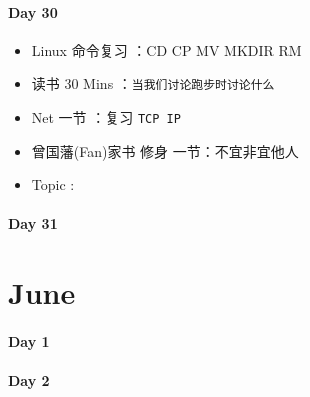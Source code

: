 \documentclass[UTF8,a4paper,8pt]{ctexart}
\begin{document}
 	 \paragraph{Day 30      \quad     }
	 	 \begin{itemize}[itemindent = 1em]
	 	 	\renewcommand\labelitemi{\makebox[0pt][l]{$\square$}\hspace{1em}} 
	 	 	\renewcommand\labelitemi{\makebox[0pt][l]{$\square$}\raisebox{.15ex}{\hspace{0.1em}$\checkmark$}}	 	
	 	 	\item   Linux 命令复习 ：CD  CP  MV MKDIR RM
	 	 	
	 	 	\item   读书  30 Mins	：\verb|当我们讨论跑步时讨论什么|
	 	 	\item   Net 一节 ：复习 \verb|TCP IP|	
	 	 	\renewcommand\labelitemi{\makebox[0pt][l]{$\square$}\hspace{1em}} 
	 	 	
	 	 	
	 	 	\renewcommand\labelitemi{\makebox[0pt][l]{$\square$}\raisebox{.15ex}{\hspace{0.1em}$\checkmark$}}
	 	 	\item   曾国藩(Fan)家书 修身 一节：不宜非宜他人
	 	 	\item   Topic :
	 	 \end{itemize}
	 	 
 	 \paragraph{Day 31      \quad     }
 	 
 \section{June}
 	 \paragraph{Day 1       \quad     }
	 	 
 	 \paragraph{Day 2       \quad     }
\end{document}
